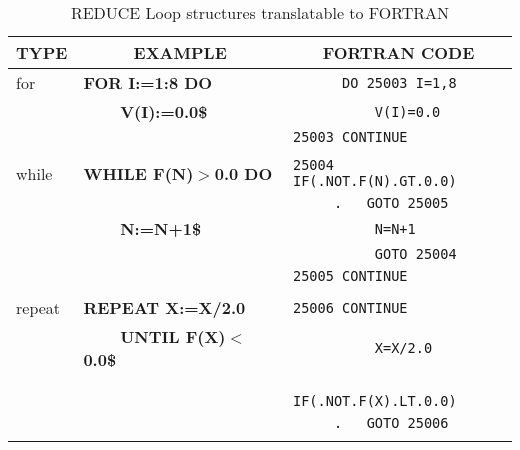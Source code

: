 \begin{table}
\begin{tabular}{||l|l|l||}\hline\hline
\multicolumn{1}{||c|}{\bf TYPE} & \multicolumn{1}{c|}{\bf EXAMPLE}
 & \multicolumn{1}{c||}{\bf FORTRAN CODE} \\ \hline\hline
    for &{\bf FOR I:=1:8 DO} &\verb!      DO 25003 I=1,8!\\
&{\bf \ \ \ \ V(I):=0.0\$} &\verb!          V(I)=0.0!\\
& &\verb!25003 CONTINUE!\\
& & \\
    while      &{\bf WHILE F(N)$>$0.0 DO} &\verb!25004 IF(.NOT.F(N).GT.0.0)!\\
               &                          &\verb!     .   GOTO 25005!\\
&{\bf \ \ \ \ N:=N+1\$} &\verb!          N=N+1!\\
& &\verb!          GOTO 25004!\\
& &\verb!25005 CONTINUE!\\
& & \\
   repeat     &{\bf REPEAT X:=X/2.0} &\verb!25006 CONTINUE!\\
&{\bf \ \ \ \ UNTIL F(X)$<$0.0\$} &\verb!          X=X/2.0!\\
& &\verb!      IF(.NOT.F(X).LT.0.0)!\\
& &\verb!     .   GOTO 25006!\\
& & \\\hline\hline
\end{tabular}
\caption{REDUCE Loop structures translatable to FORTRAN}
\end{table}

